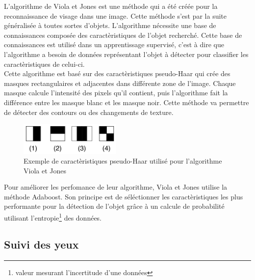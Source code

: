 L'algorithme de Viola et Jones\cite{Viola04robustreal-time} est une méthode qui a été créée pour la reconnaissance de visage dans une 
image. Cette méthode s'est par la suite généralisée à toutes sortes d'objets. L'algorithme nécessite une 
base de connaissances composée des caractèristiques de l'objet recherché. Cette base de connaissances est utilisé dans un 
apprentissage supervisé, c'est à dire que l'algorithme a besoin de données représentant
l'objet à détecter pour classifier les caractèristiques de celui-ci.\\

Cette algorithme est basé sur des caractèristiques pseudo-Haar qui crée des masques rectangulaires et adjacentes
dans différente zone de l'image. Chaque masque calcule l'intensité des pixels qu'il contient, puis l'algorithme fait
la différence entre les masque blanc et les masque noir. Cette méthode va permettre de détecter des contours ou des changements de 
texture.\\

\begin{figure}[H]
\center
\includegraphics[width=5cm]{image/pseudo_haar.png}
\caption{Exemple de caractèristiques pseudo-Haar utilisé pour l'algorithme Viola et Jones}
\end{figure}

Pour améliorer les perfomance de leur algorithme, Viola et Jones utilise la méthode Adaboost. Son
principe est de séléctionner les caractèristiques les plus performante pour la détection de l'objet grâce à
un calcule de probabilité utilisant l'entropie\footnote{valeur mesurant l'incertitude d'une données} des données.

\subsection{Suivi des yeux}

